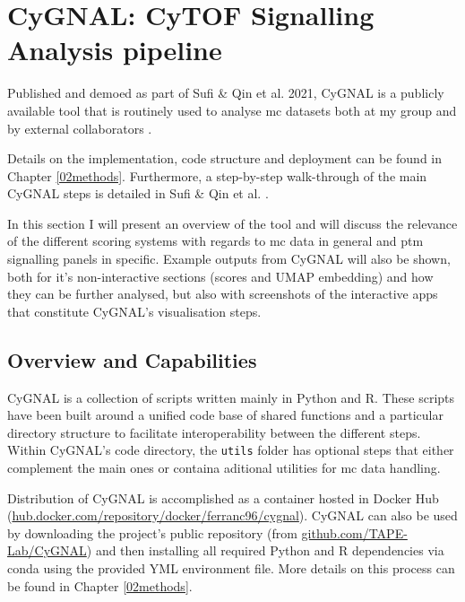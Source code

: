 \section{CyGNAL: CyTOF Signalling Analysis pipeline}

Published and demoed as part of Sufi \& Qin et al. 2021, CyGNAL is a publicly available tool that is routinely used to analyse \acrshort{mc} datasets both at my group and by external collaborators \cite{michelozzi_activation_2023}.

Details on the implementation, code structure and deployment can be found in Chapter \ref{02methods}. Furthermore, a step-by-step walk-through of the main CyGNAL steps is detailed in Sufi \& Qin et al. \cite{sufi_multiplexed_2021}.

In this section I will present an overview of the tool and will discuss the relevance of the different scoring systems with regards to \acrshort{mc} data in general and \acrshort{ptm} signalling panels in specific. Example outputs from CyGNAL will also be shown, both for it's non-interactive sections (scores and UMAP embedding) and how they can be further analysed, but also with screenshots of the interactive apps that constitute CyGNAL's visualisation steps.

\subsection{Overview and Capabilities}

CyGNAL is a collection of scripts written mainly in Python and R. These scripts have been built around a unified code base of shared functions and a particular directory structure to facilitate interoperability between the different steps. 
Within CyGNAL's code directory, the \texttt{utils} folder has optional steps that either complement the main ones or containa aditional utilities for \acrshort{mc} data handling. 

Distribution of CyGNAL is accomplished as a container hosted in Docker Hub (\href{https://hub.docker.com/repository/docker/ferranc96/cygnal}{hub.docker.com/repository/docker/ferranc96/cygnal}). CyGNAL can also be used by downloading the project's public repository (from \href{github.com/TAPE-Lab/CyGNAL}{github.com/TAPE-Lab/CyGNAL}) and then installing all required Python and R dependencies via conda using the provided YML environment file. More details on this process can be found in Chapter \ref{02methods}.

